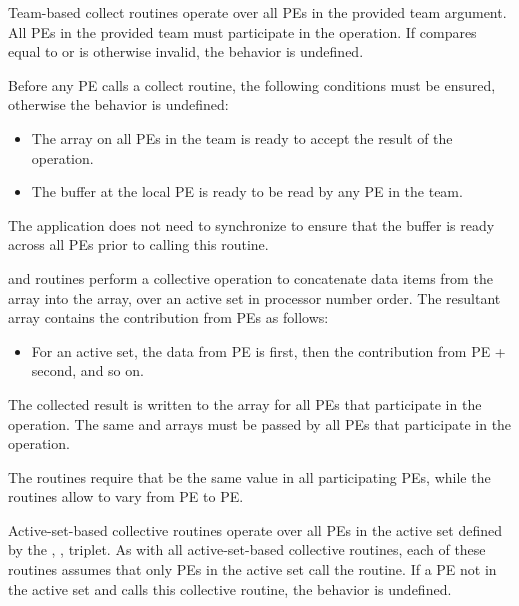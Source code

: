 \begin{apidefinition}
{    Team-based collect routines operate over all \acp{PE} in the provided team argument. All
    \acp{PE} in the provided team must participate in the operation.
    If  compares equal to  or is
    otherwise invalid, the behavior is undefined.

    Before any \ac{PE} calls a collect routine, the following conditions must
    be ensured, otherwise the behavior is undefined:
    \begin{itemize}
        \item The \dest{} array on all \acp{PE} in the team is ready to
            accept the result of the operation.
        \item The \source{} buffer at the local \ac{PE} is ready to be read
            by any \ac{PE} in the team.
    \end{itemize}
    The application does not need to synchronize to ensure that the \source{}
    buffer is ready across all \acp{PE} prior to calling this routine.

\begin{DeprecateBlock}
    \openshmem {} and  routines perform a collective
    operation to concatenate 
    data items from the \source{} array into the
    \dest{} array, over an \openshmem active set
    in processor number order. The resultant \dest{} array contains the contribution from
	\acp{PE} as follows:
    \begin{itemize}
        \item For an active set, the data from \ac{PE}  is first, then the
   	contribution from \ac{PE}  +  second, and so on.
    \end{itemize}

    The collected result is written to the \dest{} array for all \acp{PE}
    that participate in the operation. The same \dest{} and \source{}
    arrays must be passed by all \acp{PE} that participate in the operation.
    
    The  routines require that  be the same value in all
    participating \acp{PE}, while the  routines allow  to
    vary from \ac{PE} to \ac{PE}.

    Active-set-based collective routines operate over all \acp{PE} in the active set
    defined by the , ,  triplet.
    As with all active-set-based collective routines,
    each of these routines assumes that
    only \acp{PE} in the active set call the routine. If a \ac{PE} not in the
    active set and calls this collective routine, the behavior is undefined.
    

\end{DeprecateBlock}}
\end{apidefinition}
